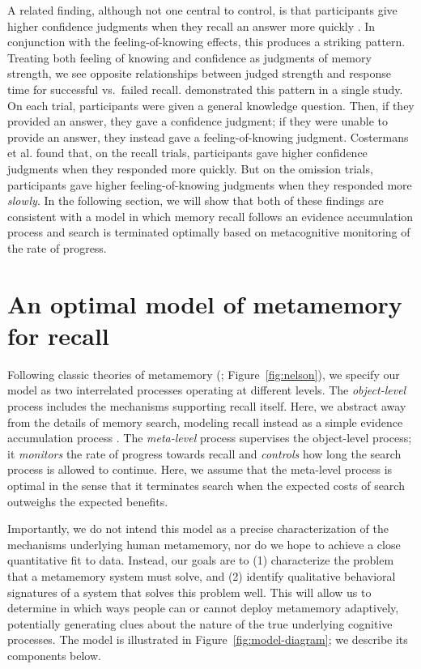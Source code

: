 A related finding, although not one central to control, is that participants give higher confidence judgments when they recall an answer more quickly \citepnelson{}. In conjunction with the feeling-of-knowing effects, this produces a striking pattern. Treating both feeling of knowing and confidence as judgments of memory strength, we see opposite relationships between judged strength and response time for successful vs.~failed recall. \citet{costermans1992confidence} demonstrated this pattern in a single study. On each trial, participants were given a general knowledge question. Then, if they provided an answer, they gave a confidence judgment; if they were unable to provide an answer, they instead gave a feeling-of-knowing judgment. Costermans et al. found that, on the recall trials, participants gave higher confidence judgments when they responded more quickly. But on the omission trials, participants gave higher feeling-of-knowing judgments when they responded more \emph{slowly}. In the following section, we will show that both of these findings are consistent with a model in which memory recall follows an evidence accumulation process and search is terminated optimally based on metacognitive monitoring of the rate of progress.

\section{An optimal model of metamemory for recall}

Following classic theories of metamemory (\citealpnelson{}; Figure~\ref{fig:nelson}), we specify our model as two interrelated processes operating at different levels. The \emph{object-level} process includes the mechanisms supporting recall itself. Here, we abstract away from the details of memory search, modeling recall instead as a simple evidence accumulation process \citep{ratcliff2002estimating,sederberg2008context}. The \emph{meta-level} process supervises the object-level process; it \emph{monitors} the rate of progress towards recall and \emph{controls} how long the search process is allowed to continue. Here, we assume that the meta-level process is optimal in the sense that it terminates search when the expected costs of search outweighs the expected benefits.

Importantly, we do not intend this model as a precise characterization of the mechanisms underlying human metamemory, nor do we hope to achieve a close quantitative fit to data. Instead, our goals are to (1) characterize the problem that a metamemory system must solve, and (2) identify qualitative behavioral signatures of a system that solves this problem well. This will allow us to determine in which ways people can or cannot deploy metamemory adaptively, potentially generating clues about the nature of the true underlying cognitive processes. The model is illustrated in Figure~\ref{fig:model-diagram}; we describe its components below.

